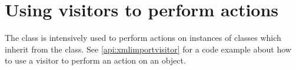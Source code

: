 \section{Using visitors to perform actions}
The \textit{} class is intensively used to perform
actions on instances of classes which inherit from the
\textit{} class. See \vref{api:xmlimportvisitor}
for a code example about how to use a visitor to perform an action on an
object.

